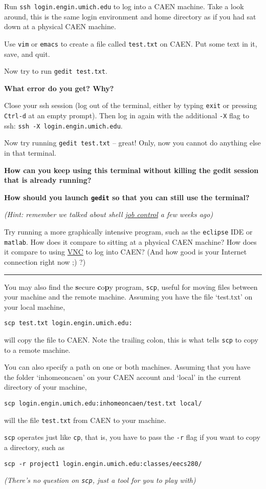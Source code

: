 \documentclass{article}
\begin{document}
Run \texttt{ssh login.engin.umich.edu} to log into a CAEN machine. Take a look
around, this is the same login environment and home directory as if you had
sat down at a physical CAEN machine.

Use \texttt{vim} or \texttt{emacs} to create a file called \texttt{test.txt}
on CAEN. Put some text in it, save, and quit.

Now try to run \texttt{gedit~test.txt}.

\textbf{What error do you get? Why?}
\vspace{6em}

Close your ssh session (log out of the terminal, either by typing
\texttt{exit} or pressing \texttt{Ctrl-d} at an empty prompt). Then log in
again with the additional \texttt{-X} flag to ssh:
\texttt{ssh~-X~login.engin.umich.edu}.

Now try running \texttt{gedit test.txt} -- great! Only, now you cannot do
anything else in that terminal.

\textbf{How can you keep using this terminal without killing the gedit session
  that is already running?}

\textbf{How should you launch \texttt{gedit} so that you can still use the
  terminal?}

\emph{\small (Hint: remember we talked about shell \ul{job control} a few
  weeks ago)}
\vspace{6em}

Try running a more graphically intensive program, such as the \texttt{eclipse}
IDE or \texttt{matlab}. How does it compare to sitting at a physical CAEN
machine? How does it compare to using
\href{http://caenfaq.engin.umich.edu/12374-Linux-Login-Service/how-do-i-connect-to-a-caen-linux-computer-remotely}{VNC}
to log into CAEN? (And how good is your Internet connection right now ;) ?)

\bigskip
\hrule
You may also find the \textbf{s}ecure \textbf{c}o\textbf{p}y program,
\texttt{scp}, useful for moving files between your machine and the remote
machine. Assuming you have the file `test.txt' on your local machine,

\texttt{scp~test.txt~login.engin.umich.edu:}

will copy the file to CAEN. Note the trailing colon, this is what tells
\texttt{scp} to copy to a remote machine.

You can also specify a path on one or both machines. Assuming that you have
the folder `inhomeoncaen' on your CAEN account and `local' in the current
directory of your machine,

\texttt{scp~login.engin.umich.edu:inhomeoncaen/test.txt~local/}

will the file \texttt{test.txt} from CAEN to your machine.

\texttt{scp} operates just like \texttt{cp}, that is, you have to pass the
\texttt{-r} flag if you want to copy a directory, such as

\texttt{scp~-r~project1~login.engin.umich.edu:classes/eecs280/}

\emph{(There's no question on \texttt{scp}, just a tool for you to play with)}
\end{document}
